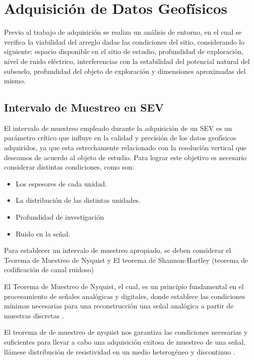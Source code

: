	\section{Adquisición de Datos Geofísicos}
	
	Previo al trabajo de adquisición se realiza un análisis de entorno, en el cual se verifica la viabilidad del arreglo dadas las condiciones del sitio, considerando lo siguiente: espacio disponible en el sitio de estudio, profundidad de exploración, nivel de ruido eléctrico, interferencias con la estabilidad del potencial natural del subsuelo, profundidad del objeto de exploración y dimensiones aproximadas del mismo.
	
		\subsection{Intervalo de Muestreo en SEV}
			
			El intervalo de muestreo empleado durante la adquisición de un SEV es un parámetro crítico que influye en la calidad y precisión de los datos geofísicos adquiridos, ya que esta estrechamente relacionado con la resolución vertical que deseamos de acuerdo al objeto de estudio. Para lograr este objetivo es necesario considerar distintas condiciones, como son:
			
			\begin{itemize}
				\item Los espesores de cada unidad.
				\item La distribución de las distintas unidades.
				\item Profundidad de investigación
				\item Ruido en la señal.
			\end{itemize}
			
			Para establecer un intervalo de muestreo apropiado, se deben considerar el Teorema de Muestreo de Nyquist y El teorema de Shannon-Hartley (teorema de codificación de canal ruidoso)
			
			 El Teorema de Muestreo de Nyquist, el cual, es un principio fundamental en el procesamiento de señales analógicas y digitales, donde establece las condiciones mínimas necesarias para una reconstrucción una señal analógica a partir de muestras discretas \citep{alvarado2010}.
			
			El teorema de de muestreo de nyquist nos garantiza las condiciones necesarias y suficientes para llevar a cabo una adquisición exitosa de muestreo de una señal, llámese distribución de resistividad en un medio heterogéneo y discontinuo \citep{alvarado2010}.
			
